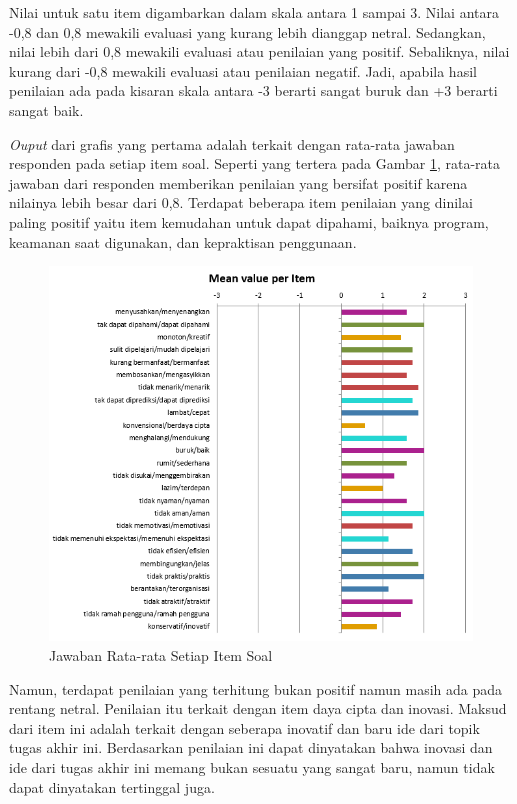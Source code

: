 Nilai untuk satu item digambarkan dalam skala antara 1 sampai 3. Nilai antara -0,8 dan 0,8 mewakili evaluasi yang kurang lebih dianggap netral. Sedangkan, nilai lebih dari 0,8 mewakili evaluasi atau penilaian yang positif. Sebaliknya, nilai kurang dari -0,8 mewakili evaluasi atau penilaian negatif. Jadi, apabila hasil penilaian ada pada kisaran skala antara -3 berarti sangat buruk dan +3 berarti sangat baik. 

\emph{Ouput} dari grafis yang pertama adalah terkait dengan rata-rata jawaban responden pada setiap item soal. Seperti yang tertera pada Gambar \ref{fig:Jawaban Rata-rata Setiap Item Soal}, rata-rata jawaban dari responden memberikan penilaian yang bersifat positif karena nilainya lebih besar dari 0,8. Terdapat beberapa item penilaian yang dinilai paling positif yaitu item kemudahan untuk dapat dipahami, baiknya program, keamanan saat digunakan, dan kepraktisan penggunaan. 

\begin{figure}[!htb]
  \centering
  \includegraphics[scale=1.15]{gambar/pengujian-user-experience/rata2-tiap-jawaban.png}
  \caption{Jawaban Rata-rata Setiap Item Soal}
  \label{fig:Jawaban Rata-rata Setiap Item Soal}
\end{figure}

Namun, terdapat penilaian yang terhitung bukan positif namun masih ada pada rentang netral. Penilaian itu terkait dengan item daya cipta dan inovasi. Maksud dari item ini adalah terkait dengan seberapa inovatif dan baru ide dari topik tugas akhir ini. Berdasarkan penilaian ini dapat dinyatakan bahwa inovasi dan ide dari tugas akhir ini memang bukan sesuatu yang sangat baru, namun tidak dapat dinyatakan tertinggal juga. 

